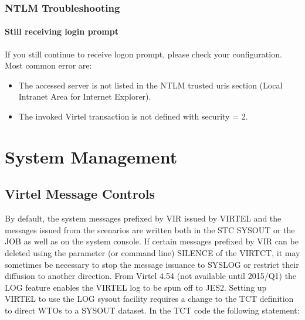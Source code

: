 \documentclass[letterpaper,10pt,english]{sphinxmanual}
\begin{document}
\ignorespaces 

\subsection{NTLM Troubleshooting}
\label{\detokenize{Customization:ntlm-troubleshooting}}\label{\detokenize{Customization:index-116}}

\subsubsection{Still receiving login prompt}
\label{\detokenize{Customization:still-receiving-login-prompt}}
\sphinxAtStartPar
If you still continue to receive logon prompt, please check your configuration. Most common error are:
\begin{itemize}
\item {} 
\sphinxAtStartPar
The accessed server is not listed in the NTLM trusted uris section (Local Intranet Area for Internet Explorer).

\item {} 
\sphinxAtStartPar
The invoked Virtel transaction is not defined with security = 2.

\end{itemize}

\ignorespaces 

\chapter{System Management}
\label{\detokenize{Customization:system-management}}\label{\detokenize{Customization:index-117}}
\ignorespaces 

\section{Virtel Message Controls}
\label{\detokenize{Customization:virtel-message-controls}}\label{\detokenize{Customization:index-118}}
\sphinxAtStartPar
By default, the system messages prefixed by VIR issued by VIRTEL and the messages issued from the scenarios are written both in the STC SYSOUT or the JOB as well as on the system console. If certain messages prefixed by VIR can be deleted using the parameter (or command line) SILENCE of the VIRTCT, it may sometimes be necessary to stop the
message issuance to SYSLOG or restrict their diffusion to another direction. From Virtel 4.54 (not available until 2015/Q1) the LOG feature enables the VIRTEL log to be spun off to JES2. Setting up VIRTEL to use the LOG sysout facility requires a change to the TCT definition to direct WTOs to a SYSOUT dataset. In the TCT code the following statement:
\end{document}
